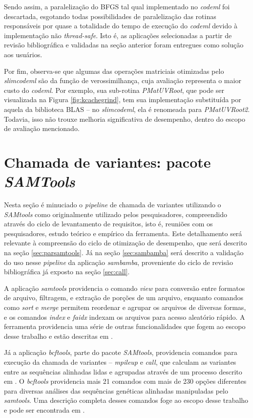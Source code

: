 \documentclass[cic,tc]{iiufrgs}
\begin{document}
Sendo assim, a paralelização do BFGS tal qual implementado no \textit{codeml} foi
descartada, esgotando todas possibilidades de paralelização das rotinas
responsáveis por quase a totalidade do tempo de execução do \textit{codeml} devido à
implementação não \textit{thread-safe}. Isto é, as aplicações selecionadas a
partir de revisão bibliográfica e validadas na seção anterior foram entregues
como solução aos usuários.

Por fim, observa-se que algumas das operações matriciais otimizadas pelo
\textit{slimcodeml} são da função de verossimilhança, cuja avaliação representa
o maior custo do \textit{codeml}. Por exemplo, sua sub-rotina
\textit{PMatUVRoot}, que pode ser visualizada na Figura \ref{fig:kcachegrind},
tem sua implementação substituída por aquela da biblioteca BLAS -- no
\textit{slimcodeml}, ela é renomeada para \textit{PMatUVRoot2}. Todavia, isso
não trouxe melhoria significativa de desempenho, dentro do escopo de avaliação
mencionado.

\section{Chamada de variantes: pacote \textit{SAMTools}}
\label{sec:SAMtools}

Nesta seção é minuciado o \textit{pipeline} de chamada de variantes utilizando
o \textit{SAMtools} como originalmente utilizado pelos pesquisadores, compreendido
através do ciclo de levantamento de requisitos, isto é, reuniões com os
pesquisadores, estudo teórico e empírico da ferramenta. Este detalhamento será
relevante à compreensão do ciclo de otimização de desempenho, que será descrito
na seção \ref{sec:parsamtools}.  Já na seção \ref{sec:sambamba} será descrito a
validação do uso nesse \textit{pipeline} da aplicação \textit{sambamba},
proveniente do ciclo de revisão bibliográfica já exposto na seção
\ref{sec:call}.

A aplicação \textit{samtools} providencia o comando \textit{view} para conversão entre
formatos de arquivo, filtragem, e extração de porções de um arquivo, enquanto
comandos como \textit{sort} e \textit{merge} permitem reordenar e agrupar os
arquivos de diversas formas, e os comandos \textit{index} e \textit{faidx}
indexam os arquivos para acesso aleatório rápido. A ferramenta providencia uma
série de outras funcionalidades que fogem ao escopo desse trabalho e estão
descritas em \cite{danecek2021twelve}.

Já a aplicação \textit{bcftools}, parte do pacote \textit{SAMtools}, providencia comandos para
execução da chamada de variantes -- \textit{mpileup} e \textit{call}, que
calculam as variantes entre as sequências alinhadas lidas e agrupadas através
de um processo descrito em \cite{li2011improving}. O \textit{bcftools} providencia mais
21 comandos com mais de 230 opções diferentes para diversas análises das
sequências genéticas alinhadas manipuladas pelo \textit{samtools}. Uma descrição
completa desses comandos foge ao escopo desse trabalho e pode ser encontrada em
\cite{danecek2021twelve}.
\end{document}
